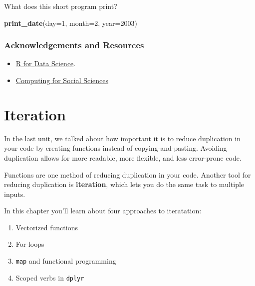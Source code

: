 \documentclass[]{book}
\newenvironment{Shaded}{\begin{snugshade}}{\end{snugshade}}
\newcommand{\DataTypeTok}[1]{\textcolor[rgb]{0.13,0.29,0.53}{#1}}
\newcommand{\DecValTok}[1]{\textcolor[rgb]{0.00,0.00,0.81}{#1}}
\newcommand{\KeywordTok}[1]{\textcolor[rgb]{0.13,0.29,0.53}{\textbf{#1}}}
\newcommand{\NormalTok}[1]{#1}
\providecommand{\tightlist}{%
  \setlength{\itemsep}{0pt}\setlength{\parskip}{0pt}}
\begin{document}
What does this short program print?

\begin{Shaded}
\begin{Highlighting}[]
\KeywordTok{print_date}\NormalTok{(}\DataTypeTok{day=}\DecValTok{1}\NormalTok{, }\DataTypeTok{month=}\DecValTok{2}\NormalTok{, }\DataTypeTok{year=}\DecValTok{2003}\NormalTok{)}
\end{Highlighting}
\end{Shaded}

\hypertarget{acknowledgements-and-resources}{%
\subsubsection*{Acknowledgements and Resources}\label{acknowledgements-and-resources}}

\begin{itemize}
\tightlist
\item
  \href{https://r4ds.had.co.nz/functions.html}{R for Data Science}.
\item
  \href{https://cfss.uchicago.edu/notes/functions}{Computing for Social Sciences}
\end{itemize}

\hypertarget{iteration}{%
\section{Iteration}\label{iteration}}

In the last unit, we talked about how important it is to reduce duplication in your code by creating functions instead of copying-and-pasting. Avoiding duplication allows for more readable, more flexible, and less error-prone code.

Functions are one method of reducing duplication in your code. Another tool for reducing duplication is \textbf{iteration}, which lets you do the same task to multiple inputs.

In this chapter you'll learn about four approaches to iteratation:

\begin{enumerate}
\def\labelenumi{\arabic{enumi}.}
\tightlist
\item
  Vectorized functions
\item
  For-loops
\item
  \texttt{map} and functional programming
\item
  Scoped verbs in \texttt{dplyr}
\end{enumerate}
\end{document}
